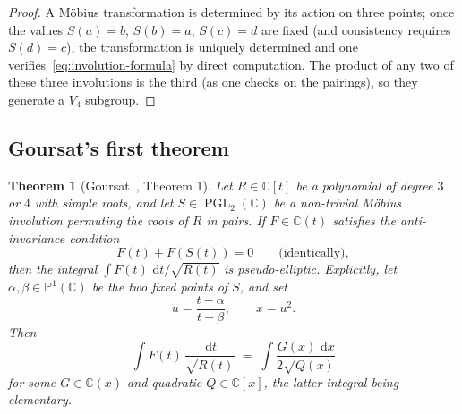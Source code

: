 \documentclass[11pt,a4paper]{article}
\theoremstyle{plain}
\newtheorem{theorem}{Theorem}[section]
\theoremstyle{definition}
\theoremstyle{remark}
\newcommand{\C}{\mathbb{C}}
\newcommand{\PGL}{\operatorname{PGL}}
\renewcommand{\d}{\,\mathrm{d}}
\begin{document}
\begin{proof}
A M\"obius transformation is determined by its action on three points; once the values $S(a)=b$, $S(b)=a$, $S(c)=d$ are fixed (and consistency requires $S(d)=c$), the transformation is uniquely determined and one verifies~\eqref{eq:involution-formula} by direct computation. The product of any two of these three involutions is the third (as one checks on the pairings), so they generate a $V_4$ subgroup.
\end{proof}

\subsection{Goursat's first theorem}

\begin{theorem}[Goursat~\cite{Goursat1887}, Theorem 1]\label{thm:goursat1}
Let $R\in\C[t]$ be a polynomial of degree $3$ or $4$ with simple roots, and let $S\in\PGL_2(\C)$ be a non-trivial M\"obius involution permuting the roots of $R$ in pairs. If $F\in\C(t)$ satisfies the \emph{anti-invariance} condition
\begin{equation}\label{eq:antiinv}
  F(t) + F(S(t)) = 0\qquad \text{(identically)},
\end{equation}
then the integral $\int F(t)\,\d t/\sqrt{R(t)}$ is pseudo-elliptic. Explicitly, let $\alpha,\beta\in\mathbb{P}^1(\C)$ be the two fixed points of $S$, and set
\[
  u = \frac{t-\alpha}{t-\beta},\qquad x = u^2.
\]
Then
\[
  \int F(t)\,\frac{\d t}{\sqrt{R(t)}} \;=\; \int \frac{G(x)\,\d x}{2\sqrt{Q(x)}}
\]
for some $G\in\C(x)$ and quadratic $Q\in\C[x]$, the latter integral being elementary.
\end{theorem}
\end{document}
